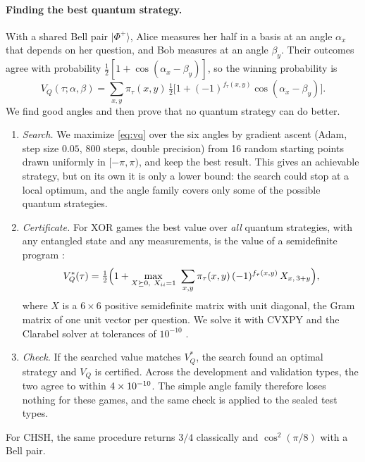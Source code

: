 \documentclass[10pt]{article}
\begin{document}
\paragraph{Finding the best quantum strategy.} With a shared Bell pair $|\Phi^+\rangle$, Alice measures her half in a basis at an angle $\alpha_x$ that depends on her question, and Bob measures at an angle $\beta_y$. Their outcomes agree with probability $\tfrac12[1+\cos(\alpha_x-\beta_y)]$, so the winning probability is
\begin{equation}
  V_Q(\tau;\alpha,\beta)=\sum_{x,y}\pi_\tau(x,y)\,\tfrac12\bigl[1+(-1)^{f_\tau(x,y)}\cos(\alpha_x-\beta_y)\bigr].
  \label{eq:vq}
\end{equation}
We find good angles and then prove that no quantum strategy can do better.
\begin{enumerate}[leftmargin=*]
  \item \emph{Search.} We maximize \cref{eq:vq} over the six angles by gradient ascent (Adam, step size $0.05$, 800 steps, double precision) from 16 random starting points drawn uniformly in $[-\pi,\pi)$, and keep the best result. This gives an achievable strategy, but on its own it is only a lower bound: the search could stop at a local optimum, and the angle family covers only some of the possible quantum strategies.
  \item \emph{Certificate.} For XOR games the best value over \emph{all} quantum strategies, with any entangled state and any measurements, is the value of a semidefinite program \citep{tsirelson1980quantum,cleve2004consequences}:
  \begin{equation}
    V_Q^{*}(\tau)=\tfrac12\Bigl(1+\max_{X\succeq0,\ X_{ii}=1}\ \sum_{x,y}\pi_\tau(x,y)\,(-1)^{f_\tau(x,y)}\,X_{x,\,3+y}\Bigr),
    \label{eq:sdp}
  \end{equation}
  where $X$ is a $6\times6$ positive semidefinite matrix with unit diagonal, the Gram matrix of one unit vector per question. We solve it with CVXPY and the Clarabel solver at tolerances of $10^{-10}$ \citep{diamond2016cvxpy}.
  \item \emph{Check.} If the searched value matches $V_Q^{*}$, the search found an optimal strategy and $V_Q$ is certified. Across the \nonTestTypes{} development and validation types, the two agree to within $4\times 10^{-10}$. The simple angle family therefore loses nothing for these games, and the same check is applied to the sealed test types.
\end{enumerate}
For CHSH, the same procedure returns $3/4$ classically and $\cos^2(\pi/8)$ with a Bell pair.
\end{document}
